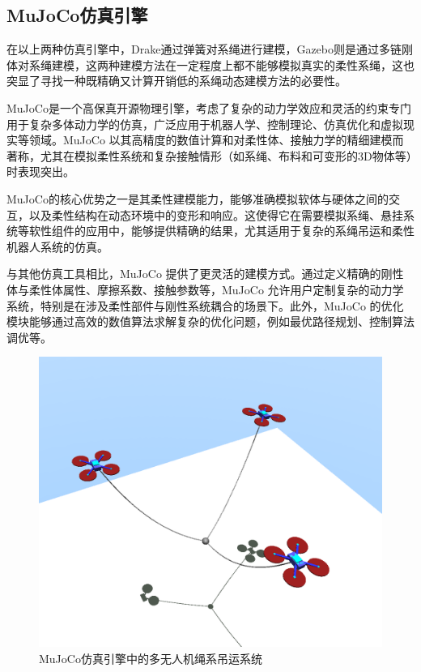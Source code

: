 \documentclass[lang=chs, degree=master, blindreview=true, winfonts=true]{yanputhesis}
\begin{document}
\subsection{MuJoCo仿真引擎}

在以上两种仿真引擎中，Drake通过弹簧对系绳进行建模，Gazebo则是通过多链刚体对系绳建模，这两种建模方法在一定程度上都不能够模拟真实的柔性系绳，这也突显了寻找一种既精确又计算开销低的系绳动态建模方法的必要性。

MuJoCo是一个高保真开源物理引擎，考虑了复杂的动力学效应和灵活的约束专门用于复杂多体动力学的仿真，广泛应用于机器人学、控制理论、仿真优化和虚拟现实等领域。MuJoCo 以其高精度的数值计算和对柔性体、接触力学的精细建模而著称，尤其在模拟柔性系统和复杂接触情形（如系绳、布料和可变形的3D物体等）时表现突出。

MuJoCo的核心优势之一是其柔性建模能力，能够准确模拟软体与硬体之间的交互，以及柔性结构在动态环境中的变形和响应。这使得它在需要模拟系绳、悬挂系统等软性组件的应用中，能够提供精确的结果，尤其适用于复杂的系绳吊运和柔性机器人系统的仿真。

与其他仿真工具相比，MuJoCo 提供了更灵活的建模方式。通过定义精确的刚性体与柔性体属性、摩擦系数、接触参数等，MuJoCo 允许用户定制复杂的动力学系统，特别是在涉及柔性部件与刚性系统耦合的场景下。此外，MuJoCo 的优化模块能够通过高效的数值算法求解复杂的优化问题，例如最优路径规划、控制算法调优等。

\begin{figure}[hbt!]
	\centering
	\includegraphics[width=34pc]{picture/5_3.png} 
	\caption{MuJoCo仿真引擎中的多无人机绳系吊运系统} 
	\label{5_3}
\end{figure}
\end{document}
